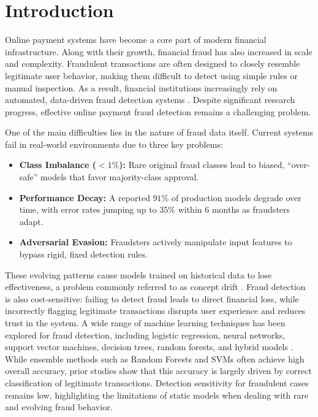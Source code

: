 \documentclass[conference]{IEEEtran}
\begin{document}
\section{Introduction}
Online payment systems have become a core part of modern financial infrastructure. Along with their growth, financial fraud has also increased in scale and complexity. Fraudulent transactions are often designed to closely resemble legitimate user behavior, making them difficult to detect using simple rules or manual inspection. As a result, financial institutions increasingly rely on automated, data-driven fraud detection systems \cite{west2016intelligent}. Despite significant research progress, effective online payment fraud detection remains a challenging problem.

One of the main difficulties lies in the nature of fraud data itself. Current systems fail in real-world environments due to three key problems:
\begin{itemize}
    \item \textbf{Class Imbalance ($<1\%$):} Rare original fraud classes lead to biased, ``over-safe'' models that favor majority-class approval.
    \item \textbf{Performance Decay:} A reported $91\%$ of production models degrade over time, with error rates jumping up to $35\%$ within 6 months as fraudsters adapt.
    \item \textbf{Adversarial Evasion:} Fraudsters actively manipulate input features to bypass rigid, fixed detection rules.
\end{itemize}

These evolving patterns cause models trained on historical data to lose effectiveness, a problem commonly referred to as concept drift \cite{dalpozzo2015learning, fawcett1997adaptive}. Fraud detection is also cost-sensitive: failing to detect fraud leads to direct financial loss, while incorrectly flagging legitimate transactions disrupts user experience and reduces trust in the system. A wide range of machine learning techniques has been explored for fraud detection, including logistic regression, neural networks, support vector machines, decision trees, random forests, and hybrid models \cite{west2016intelligent}. While ensemble methods such as Random Forests and SVMs often achieve high overall accuracy, prior studies show that this accuracy is largely driven by correct classification of legitimate transactions. Detection sensitivity for fraudulent cases remains low, highlighting the limitations of static models when dealing with rare and evolving fraud behavior.
\end{document}
